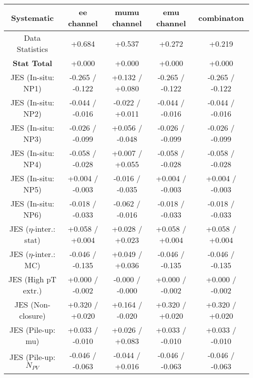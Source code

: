 \begin{table}[htbp]
\scriptsize
  \begin{center} 
  \begin{tabular}{|c|c|c|c|c|}
  \hline
Systematic                            &  ee channel&  mumu channel&  emu channel&  combinaton\\
  \hline
Data Statistics                       &+0.684              & +0.537              & +0.272              & +0.219             \\
\hline
\textbf{Stat Total}                   &+0.000              & +0.000              & +0.000              & +0.000             \\
\hline
JES (In-situ: NP1)                    &-0.265   / -0.122   & +0.132   / +0.080   & -0.265   / -0.122   & -0.265   / -0.122  \\
JES (In-situ: NP2)                    &-0.044   / -0.016   & -0.022   / +0.011   & -0.044   / -0.016   & -0.044   / -0.016  \\
JES (In-situ: NP3)                    &-0.026   / -0.099   & +0.056   / -0.048   & -0.026   / -0.099   & -0.026   / -0.099  \\
JES (In-situ: NP4)                    &-0.058   / -0.028   & +0.007   / +0.055   & -0.058   / -0.028   & -0.058   / -0.028  \\
JES (In-situ: NP5)                    &+0.004   / -0.003   & -0.016   / -0.035   & +0.004   / -0.003   & +0.004   / -0.003  \\
JES (In-situ: NP6)                    &-0.018   / -0.033   & -0.062   / -0.016   & -0.018   / -0.033   & -0.018   / -0.033  \\
JES ($\eta$-inter.: stat)               &+0.058   / +0.004   & +0.028   / +0.023   & +0.058   / +0.004   & +0.058   / +0.004  \\
JES ($\eta$-inter.: MC)                 &-0.046   / -0.135   & +0.049   / +0.036   & -0.046   / -0.135   & -0.046   / -0.135  \\
JES (High pT extr.)                  &+0.000   / -0.002   & -0.000   / -0.000   & +0.000   / -0.002   & +0.000   / -0.002  \\
JES (Non-closure)                     &+0.320   / +0.020   & +0.164   / -0.020   & +0.320   / +0.020   & +0.320   / +0.020  \\
JES (Pile-up: mu)                     &+0.033   / -0.010   & +0.026   / +0.083   & +0.033   / -0.010   & +0.033   / -0.010  \\
JES (Pile-up: $N_{PV}$                  &-0.046   / -0.063   & -0.044   / +0.016   & -0.046   / -0.063   & -0.046   / -0.063  \\

\end{tabular}
\end{center}
\end{table}
